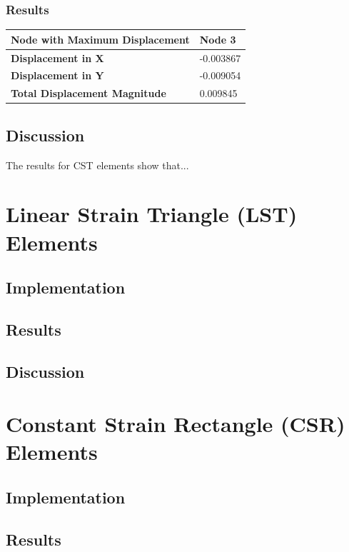\documentclass[12pt]{report}
\begin{document}
\subsection{Results}
\begin{tabular}{|l|l|}
	\hline
	\textbf{Node with Maximum Displacement} & Node 3 \\ \hline
	\textbf{Displacement in X} & -0.003867 \\ \hline
	\textbf{Displacement in Y} & -0.009054 \\ \hline
	\textbf{Total Displacement Magnitude} & 0.009845 \\ \hline
\end{tabular}
	
	\section{Discussion}
	The results for CST elements show that...
	
	\chapter{Linear Strain Triangle (LST) Elements}
	\section{Implementation}
	
	\section{Results}
	
	\section{Discussion}
	
	\chapter{Constant Strain Rectangle (CSR) Elements}
	\section{Implementation}
	
	\section{Results}
	
\end{document}
